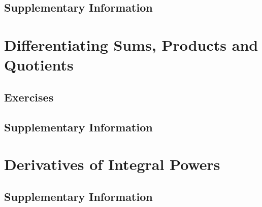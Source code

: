 \documentclass{fts_m2}
\begin{document}
    \subsection*{Supplementary Information}
    

    \section{Differentiating Sums, Products and Quotients}
    
    \subsection*{Exercises}
    
    \subsection*{Supplementary Information}
    

    \section{Derivatives of Integral Powers}
    
    \subsection*{Supplementary Information}
    

\end{document}
